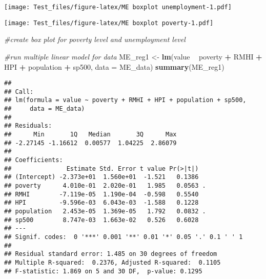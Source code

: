 \documentclass[
]{article}
\newenvironment{Shaded}{\begin{snugshade}}{\end{snugshade}}
\newcommand{\CommentTok}[1]{\textcolor[rgb]{0.56,0.35,0.01}{\textit{#1}}}
\newcommand{\DataTypeTok}[1]{\textcolor[rgb]{0.13,0.29,0.53}{#1}}
\newcommand{\KeywordTok}[1]{\textcolor[rgb]{0.13,0.29,0.53}{\textbf{#1}}}
\newcommand{\NormalTok}[1]{#1}
\newcommand{\OperatorTok}[1]{\textcolor[rgb]{0.81,0.36,0.00}{\textbf{#1}}}
\newcommand{\StringTok}[1]{\textcolor[rgb]{0.31,0.60,0.02}{#1}}
\begin{document}
\texttt{[image: Test\_files/figure-latex/ME boxplot unemployment-1.pdf]}

\begin{Shaded}
\end{Shaded}

\texttt{[image: Test\_files/figure-latex/ME boxplot poverty-1.pdf]}

\begin{Shaded}
\begin{Highlighting}[]
\CommentTok{#create box plot for poverty level and unemployment level}
\end{Highlighting}
\end{Shaded}

\begin{Shaded}
\begin{Highlighting}[]
\CommentTok{#run multiple linear model for data}
\NormalTok{ME_reg1 <-}\StringTok{ }\KeywordTok{lm}\NormalTok{(value }\OperatorTok{~}\StringTok{ }\NormalTok{poverty }\OperatorTok{+}\StringTok{ }\NormalTok{RMHI }\OperatorTok{+}\StringTok{ }\NormalTok{HPI }\OperatorTok{+}\StringTok{ }\NormalTok{population }\OperatorTok{+}\StringTok{ }\NormalTok{sp500, }\DataTypeTok{data =}\NormalTok{ ME_data)}
\KeywordTok{summary}\NormalTok{(ME_reg1)}
\end{Highlighting}
\end{Shaded}

\begin{verbatim}
## 
## Call:
## lm(formula = value ~ poverty + RMHI + HPI + population + sp500, 
##     data = ME_data)
## 
## Residuals:
##      Min       1Q   Median       3Q      Max 
## -2.27145 -1.16612  0.00577  1.04225  2.86079 
## 
## Coefficients:
##               Estimate Std. Error t value Pr(>|t|)  
## (Intercept) -2.373e+01  1.560e+01  -1.521   0.1386  
## poverty      4.010e-01  2.020e-01   1.985   0.0563 .
## RMHI        -7.119e-05  1.190e-04  -0.598   0.5540  
## HPI         -9.596e-03  6.043e-03  -1.588   0.1228  
## population   2.453e-05  1.369e-05   1.792   0.0832 .
## sp500        8.747e-03  1.663e-02   0.526   0.6028  
## ---
## Signif. codes:  0 '***' 0.001 '**' 0.01 '*' 0.05 '.' 0.1 ' ' 1
## 
## Residual standard error: 1.485 on 30 degrees of freedom
## Multiple R-squared:  0.2376, Adjusted R-squared:  0.1105 
## F-statistic: 1.869 on 5 and 30 DF,  p-value: 0.1295
\end{verbatim}
\end{document}
